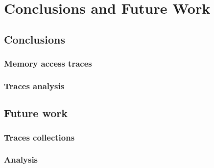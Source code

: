 \chapter{Conclusions and Future Work}

\section{Conclusions}

\subsection{Memory access traces}
\subsection{Traces analysis}


\section{Future work}

\subsection{Traces collections}


\subsection{Analysis}
